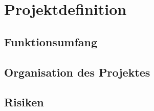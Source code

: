 
\chapter{Projektdefinition}
	
	\section{Funktionsumfang}
	
	\section{Organisation des Projektes}
	
	\section{Risiken}